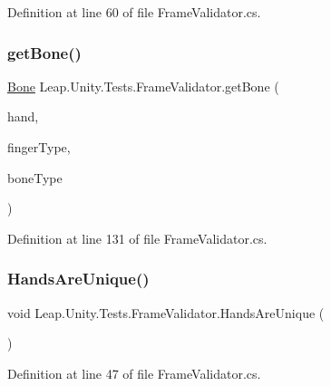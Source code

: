 Definition at line 60 of file Frame\+Validator.\+cs.

\mbox{\label{class_leap_1_1_unity_1_1_tests_1_1_frame_validator_a829eb479c186cf2791b4983128f460b7}} 
\subsubsection{\texorpdfstring{getBone()}{getBone()}}
{\footnotesize\ttfamily \mbox{\hyperlink{class_leap_1_1_bone}{Bone}} Leap.\+Unity.\+Tests.\+Frame\+Validator.\+get\+Bone (\begin{DoxyParamCaption}\item[{\mbox{\hyperlink{class_leap_1_1_hand}{Hand}}}]{hand,  }\item[{\mbox{\hyperlink{class_leap_1_1_finger_ae75e8d46a01aff0bd5c6d6fb99e2f2ba}{Finger.\+Finger\+Type}}}]{finger\+Type,  }\item[{\mbox{\hyperlink{class_leap_1_1_bone_a21054e31cefa7b75f25a026006fdbb1b}{Bone.\+Bone\+Type}}}]{bone\+Type }\end{DoxyParamCaption})\hspace{0.3cm}{\ttfamily [protected]}}



Definition at line 131 of file Frame\+Validator.\+cs.

\mbox{\label{class_leap_1_1_unity_1_1_tests_1_1_frame_validator_ac68295024dab243f9b07c3dde5b6ef83}} 
\subsubsection{\texorpdfstring{HandsAreUnique()}{HandsAreUnique()}}
{\footnotesize\ttfamily void Leap.\+Unity.\+Tests.\+Frame\+Validator.\+Hands\+Are\+Unique (\begin{DoxyParamCaption}{ }\end{DoxyParamCaption})}



Definition at line 47 of file Frame\+Validator.\+cs.

